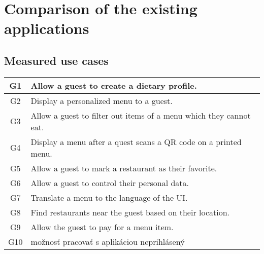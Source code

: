 \section{Comparison of the existing applications}

\subsection*{Measured use cases}


\begin{center}
  \begin{tabular}{| c | l |}
    \hline
    G1 & Allow a guest to create a dietary profile. \\
    \hline
    G2 & Display a personalized menu to a guest. \\
    \hline
    G3 & Allow a guest to filter out items of a menu which they cannot eat. \\
    \hline
    G4 & Display a menu after a quest scans a QR code on a printed menu. \\
    \hline
    G5 & Allow a guest to mark a restaurant as their favorite. \\
    \hline
    G6 & Allow a guest to control their personal data. \\
    \hline
    G7 & Translate a menu to the language of the UI. \\
    \hline
    G8 & Find restaurants near the guest based on their location. \\
    \hline
    G9 & Allow the guest to pay for a menu item. \\ %
    \hline
    G10 & možnosť pracovať s aplikáciou neprihlásený \\
    \hline
  \end{tabular}
  \newline
\end{center}


